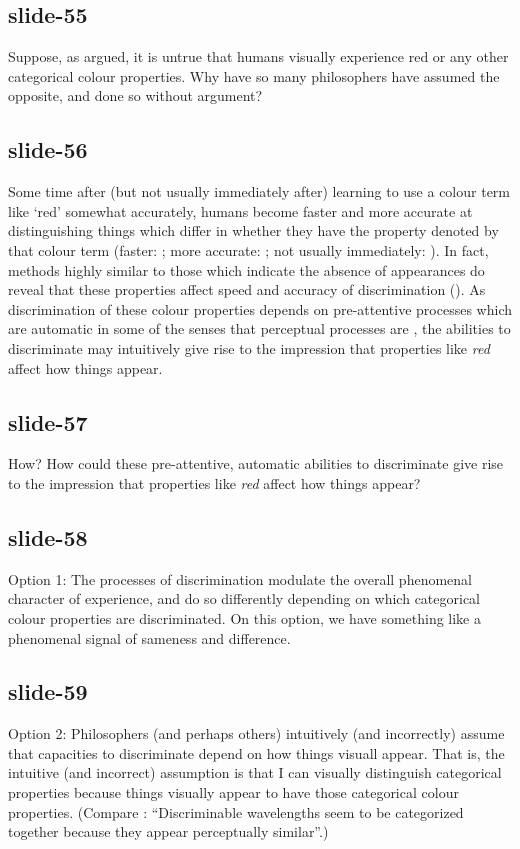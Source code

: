 \documentclass[12pt,\papersize]{extarticle}
\begin{document}
\subsection{slide-55}
Suppose, as argued, it is untrue that humans visually experience red or any
other categorical colour properties.
Why have so many philosophers have assumed the opposite, and done so without argument?

\subsection{slide-56}
Some time  after (but not usually immediately after)  learning to use a colour term like
‘red’ somewhat accurately, humans become faster and more accurate at
distinguishing things which differ in whether they have the property denoted by
that colour term (faster: \citealp{Bornstein:1984cb}; more accurate:
\citealp[p.\ 22--7]{Roberson:1999rk}; not usually immediately:
\citealp{Franklin:2005hp}). In fact, methods highly similar to those which
indicate the absence of appearances do reveal that these properties affect
speed and accuracy of discrimination (\citealp{witzel:2014_categorical}). As
discrimination of these colour properties depends on pre-attentive processes
which are automatic in some of the senses that perceptual processes are
\citep{Daoutis:2006ij,clifford_color_2010}, the abilities to discriminate may
intuitively give rise to the impression that properties like \emph{red} affect
how things appear.

\subsection{slide-57}
How?
How could these pre-attentive, automatic abilities to discriminate
give rise to the impression that properties like \emph{red} affect
how things appear?

\subsection{slide-58}
Option 1: The processes of discrimination modulate the overall phenomenal
character of experience, and do so differently depending on which
categorical colour properties are discriminated.
On this option, we have something like a phenomenal signal of sameness and
difference.

\subsection{slide-59}
Option 2: Philosophers (and perhaps others) intuitively (and incorrectly) assume that
capacities to discriminate depend on how things visuall appear.
That is, the intuitive (and incorrect) assumption is that
I can visually distinguish categorical properties because things
visually appear to have those categorical colour properties.
(Compare  \citep[pp.~288--9]{Bornstein:1987vv}:
“Discriminable wavelengths seem to be categorized together because they appear perceptually similar”.)








\end{document}

